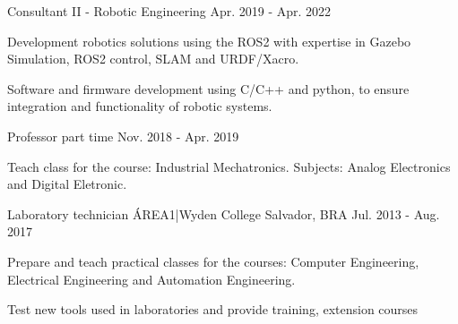 \begin{cventries}
\cventry
  {Consultant II - Robotic Engineering} %
  {} %
  {} %
  {Apr. 2019 - Apr. 2022} %
  {
    \begin{cvitems} %
      \item {Development robotics solutions using the ROS2 with expertise in Gazebo Simulation, ROS2 control, SLAM and URDF/Xacro.}
      \item {Software and firmware development using C/C++ and python, to ensure integration and functionality of robotic systems.}
    \end{cvitems}
  }

  \cventry
    {Professor part time} %
    {} %
    {} %
    {Nov. 2018 - Apr. 2019} %
    {
      \begin{cvitems} %
        \item {Teach class for the course: Industrial Mechatronics. Subjects: Analog Electronics and Digital Eletronic.}
      \end{cvitems}
    }

    
  \cventry
    {Laboratory technician} %
    {ÁREA1|Wyden College} %
    {Salvador, BRA} %
    {Jul. 2013 - Aug. 2017} %
    {
      \begin{cvitems} %
        \item {Prepare and teach practical classes for the courses: Computer Engineering, Electrical Engineering and Automation Engineering.}
        \item {Test new tools used in laboratories and provide training, extension courses}
      \end{cvitems}
    }


\end{cventries}
